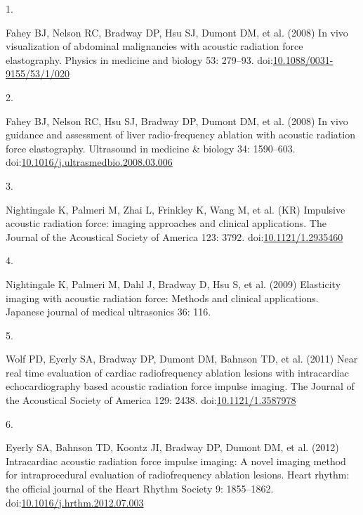 \documentclass[
]{article}
\newlength{\cslhangindent}
\newlength{\csllabelwidth}
\newenvironment{CSLReferences}[2] %
 {\begin{list}{}{%
  \setlength{\itemindent}{0pt}
  \setlength{\leftmargin}{0pt}
  \setlength{\parsep}{0pt}
  \ifodd #1
   \setlength{\leftmargin}{\cslhangindent}
   \setlength{\itemindent}{-1\cslhangindent}
  \fi
  \setlength{\itemsep}{#2\baselineskip}}}
 {\end{list}}
\newcommand{\CSLLeftMargin}[1]{\parbox[t]{\csllabelwidth}{\strut#1\strut}}
\newcommand{\CSLRightInline}[1]{\parbox[t]{\linewidth - \csllabelwidth}{\strut#1\strut}}
\begin{document}
\label{refs}
\begin{CSLReferences}{0}{1}
\CSLLeftMargin{1. }%
\CSLRightInline{Fahey BJ, Nelson RC, Bradway DP, Hsu SJ, Dumont DM, et
al. (2008) {In vivo visualization of abdominal malignancies with
acoustic radiation force elastography}. Physics in medicine and biology
53: 279--93.
doi:\href{https://doi.org/10.1088/0031-9155/53/1/020}{10.1088/0031-9155/53/1/020}}

\CSLLeftMargin{2. }%
\CSLRightInline{Fahey BJ, Nelson RC, Hsu SJ, Bradway DP, Dumont DM, et
al. (2008) {In vivo guidance and assessment of liver radio-frequency
ablation with acoustic radiation force elastography}. Ultrasound in
medicine \& biology 34: 1590--603.
doi:\href{https://doi.org/10.1016/j.ultrasmedbio.2008.03.006}{10.1016/j.ultrasmedbio.2008.03.006}}

\CSLLeftMargin{3. }%
\CSLRightInline{Nightingale K, Palmeri M, Zhai L, Frinkley K, Wang M, et
al. (KR) {Impulsive acoustic radiation force: imaging approaches and
clinical applications}. The Journal of the Acoustical Society of America
123: 3792.
doi:\href{https://doi.org/10.1121/1.2935460}{10.1121/1.2935460}}

\CSLLeftMargin{4. }%
\CSLRightInline{Nightingale K, Palmeri M, Dahl J, Bradway D, Hsu S, et
al. (2009) Elasticity imaging with acoustic radiation force: Methods and
clinical applications. Japanese journal of medical ultrasonics 36: 116.}

\CSLLeftMargin{5. }%
\CSLRightInline{Wolf PD, Eyerly SA, Bradway DP, Dumont DM, Bahnson TD,
et al. (2011) {Near real time evaluation of cardiac radiofrequency
ablation lesions with intracardiac echocardiography based acoustic
radiation force impulse imaging}. The Journal of the Acoustical Society
of America 129: 2438.
doi:\href{https://doi.org/10.1121/1.3587978}{10.1121/1.3587978}}

\CSLLeftMargin{6. }%
\CSLRightInline{Eyerly SA, Bahnson TD, Koontz JI, Bradway DP, Dumont DM,
et al. (2012) {Intracardiac acoustic radiation force impulse imaging: A
novel imaging method for intraprocedural evaluation of radiofrequency
ablation lesions}. Heart rhythm: the official journal of the Heart
Rhythm Society 9: 1855--1862.
doi:\href{https://doi.org/10.1016/j.hrthm.2012.07.003}{10.1016/j.hrthm.2012.07.003}}


\end{CSLReferences}
\end{document}
